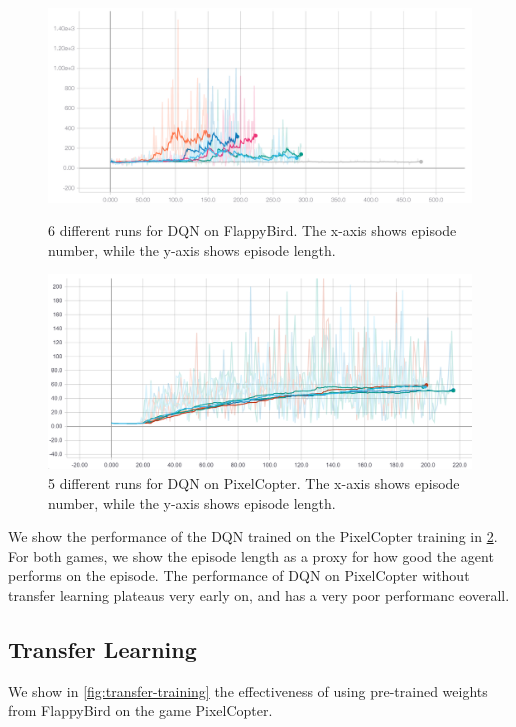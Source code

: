 \documentclass{article}
\begin{document}
\begin{figure}[h!]
\includegraphics[width=\textwidth]{flappy-training-eps}
\label{fig:flappy-training-eps}
\caption{6 different runs for DQN on FlappyBird. The x-axis shows episode number, while the y-axis shows episode length.}
\end{figure}

\begin{figure}[h!]
\includegraphics[width=\textwidth]{pixelcopter-training}
\caption{5 different runs for DQN on PixelCopter. The x-axis shows episode number, while the y-axis shows episode length.}
\label{fig:other-training}
\end{figure}
We show the performance of the DQN trained on the PixelCopter training in \ref{fig:other-training}.
For both games, we show the episode length as a proxy for how good the agent performs on the episode.
The performance of DQN on PixelCopter without transfer learning plateaus very early on, and has a very poor performanc eoverall.

\subsection{Transfer Learning}
We show in \ref{fig:transfer-training} the effectiveness of using pre-trained weights from FlappyBird on the game PixelCopter.
\end{document}
